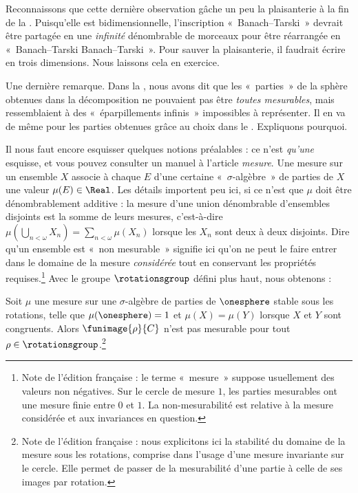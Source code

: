 \documentclass[../../../include/open-logic-section]{subfiles}
\begin{document}
Reconnaissons que cette dernière
observation gâche un peu la
plaisanterie à la fin de la
.
Puisqu'elle est bidimensionnelle,
l'inscription «~Banach--Tarski~»
devrait être partagée en une
\emph{infinité} dénombrable
de morceaux pour être réarrangée
en «~Banach--Tarski
Banach--Tarski~».
Pour sauver la plaisanterie,
il faudrait écrire en trois
dimensions. Nous laissons
cela en exercice.

Une dernière remarque. Dans la
, nous avons
dit que les «~parties~» de la
sphère obtenues dans la
décomposition ne pouvaient
pas être \emph{toutes mesurables},
mais ressemblaient à des
«~éparpillements infinis~»
impossibles à représenter.
Il en va de même pour les
parties obtenues grâce au
choix dans le .
Expliquons pourquoi.

Il nous faut encore esquisser
quelques notions préalables :
ce n'est \emph{qu'une} esquisse,
et vous pouvez consulter un
manuel à l'article
\emph{mesure}. Une mesure
sur un ensemble $X$ associe
à chaque $E$ d'une certaine
«~$\sigma$-algèbre~» de
parties de $X$ une valeur
$\mu(E)\in\Real$.
Les détails importent peu ici,
si ce n'est que $\mu$ doit
être dénombrablement additive :
la mesure d'une union
dénombrable d'ensembles
disjoints est la somme
de leurs mesures, c'est-à-dire
$\mu(\bigcup_{n<\omega}X_n)
=\sum_{n<\omega}\mu(X_n)$
lorsque les $X_n$ sont
deux à deux disjoints.
Dire qu'un ensemble est
«~non mesurable~» signifie
ici qu'on ne peut le faire
entrer dans le domaine de
la mesure \emph{considérée}
tout en conservant les
propriétés requises.\footnote{
Note de l'édition française :
le terme «~mesure~» suppose
usuellement des valeurs non négatives.
Sur le cercle de mesure $1$,
les parties mesurables ont une
mesure finie entre $0$ et $1$.
La non-mesurabilité est relative
à la mesure considérée et aux
invariances en question.
%
}
Avec le groupe
$\rotationsgroup$ défini
plus haut, nous obtenons :

\begin{cor}[Vitali]
Soit $\mu$ une mesure sur
une $\sigma$-algèbre de
parties de $\onesphere$
stable sous les rotations,
telle que
$\mu(\onesphere)=1$ et
$\mu(X)=\mu(Y)$ lorsque
$X$ et $Y$ sont congruents.
Alors $\funimage{\rho}{C}$
n'est pas mesurable pour
tout $\rho\in\rotationsgroup$.\footnote{
Note de l'édition française :
nous explicitons ici la stabilité
du domaine de la mesure sous les
rotations, comprise dans l'usage
d'une mesure invariante sur le cercle.
Elle permet de passer de la
mesurabilité d'une partie à celle
de ses images par rotation.
}
\end{cor}
\end{document}
